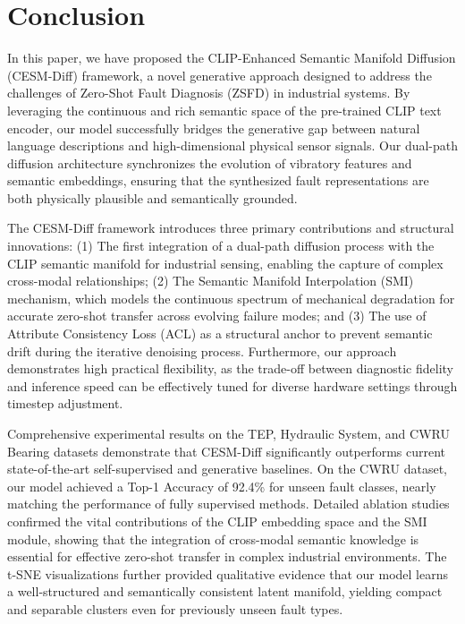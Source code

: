 \section{Conclusion}
\label{sec:conclusion}

In this paper, we have proposed the CLIP-Enhanced Semantic Manifold Diffusion (CESM-Diff) framework, a novel generative approach designed to address the challenges of Zero-Shot Fault Diagnosis (ZSFD) in industrial systems. By leveraging the continuous and rich semantic space of the pre-trained CLIP text encoder, our model successfully bridges the generative gap between natural language descriptions and high-dimensional physical sensor signals. Our dual-path diffusion architecture synchronizes the evolution of vibratory features and semantic embeddings, ensuring that the synthesized fault representations are both physically plausible and semantically grounded.

The CESM-Diff framework introduces three primary contributions and structural innovations: (1) The first integration of a dual-path diffusion process with the CLIP semantic manifold for industrial sensing, enabling the capture of complex cross-modal relationships; (2) The Semantic Manifold Interpolation (SMI) mechanism, which models the continuous spectrum of mechanical degradation for accurate zero-shot transfer across evolving failure modes; and (3) The use of Attribute Consistency Loss (ACL) as a structural anchor to prevent semantic drift during the iterative denoising process. Furthermore, our approach demonstrates high practical flexibility, as the trade-off between diagnostic fidelity and inference speed can be effectively tuned for diverse hardware settings through timestep adjustment.

Comprehensive experimental results on the TEP, Hydraulic System, and CWRU Bearing datasets demonstrate that CESM-Diff significantly outperforms current state-of-the-art self-supervised and generative baselines. On the CWRU dataset, our model achieved a Top-1 Accuracy of 92.4\% for unseen fault classes, nearly matching the performance of fully supervised methods. Detailed ablation studies confirmed the vital contributions of the CLIP embedding space and the SMI module, showing that the integration of cross-modal semantic knowledge is essential for effective zero-shot transfer in complex industrial environments. The t-SNE visualizations further provided qualitative evidence that our model learns a well-structured and semantically consistent latent manifold, yielding compact and separable clusters even for previously unseen fault types.

